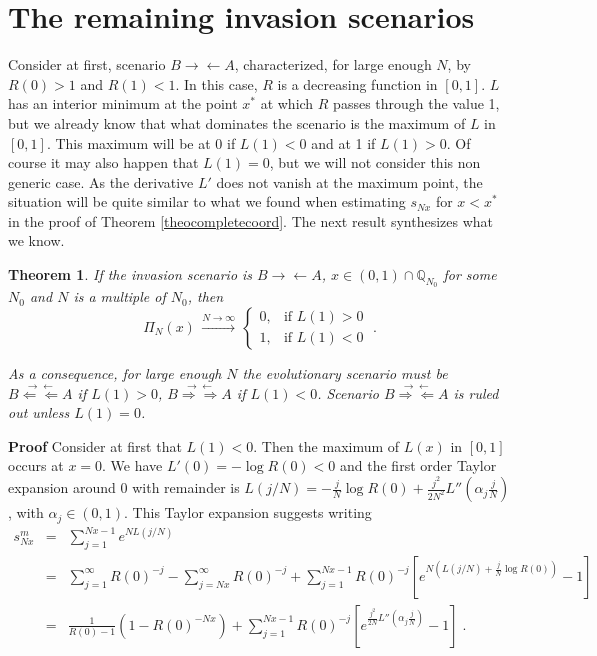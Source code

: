 \documentclass[12pt]{article}
\newtheorem{theorem}{Theorem}
\begin{document}
\section{The remaining invasion scenarios}\label{secremaining}
Consider at first, scenario $B\rightarrow \leftarrow A$,
characterized, for large enough $N$, by  $R(0)>1$ and $R(1)<1$. In this case, $R$ is a decreasing function in $[0,1]$. $L$ has an interior minimum at the point $x^{\ast}$ at which $R$ passes through the value 1, but we already know that what dominates the scenario is the maximum of $L$ in $[0,1]$. This maximum will be at 0 if $L(1)<0$ and at 1 if $L(1)>0$. Of course it may also happen that $L(1)=0$, but we will not consider this non generic case. As the derivative $L'$ does not vanish at the maximum point, the situation will be quite similar to what we found when estimating $s_{Nx}$ for  $x<x^{\ast}$ in the proof of Theorem \ref{theocompletecoord}. The next result synthesizes what we know.
\begin{theorem}  \label{theocoex}
	If the invasion scenario is $B\rightarrow \leftarrow A$, $x \in (0,1) \cap \mathbb{Q}_{N_0}$ for some $N_0$ and $N$ is a multiple of $N_0$, then
	\begin{equation} \label{Picoexist}
	\Pi_N(x) \,\stackrel{N \rightarrow \infty}{\rightarrow}\, \begin{cases} 0, &\mbox{if } L(1)>0 \\ 
	\displaystyle 1, & \mbox{if }  L(1)<0 \end{cases} \;.
	\end{equation}
	
	As a consequence, for large enough $N$ the evolutionary scenario must be $B\stackrel{\rightarrow \leftarrow}{\Leftarrow \Leftarrow} A$ if $L(1)>0$, $B\stackrel{\rightarrow \leftarrow}{\Rightarrow \Rightarrow} A$ if $L(1)<0$. Scenario $B\stackrel{\rightarrow \leftarrow}{\Rightarrow \Leftarrow} A$ is ruled out unless $L(1)=0$.
\end{theorem}
\textbf{Proof}
Consider at first that $L(1)<0$. Then the maximum of $L(x)$ in $[0,1]$ occurs at $x=0$. We have $L'(0)= -\log R(0)<0$ and the first order Taylor expansion around 0 with remainder is $L(j/N)= - \frac{j}{N} \log R(0) + \frac{j^2}{2N^2} L''(\alpha_j \frac{j}{N})$, with $\alpha_j \in(0,1)$. This Taylor expansion suggests writing
\begin{eqnarray}
s^m_{Nx}&=& \sum_{j=1}^{Nx-1}e^{N L(j/N)}\nonumber\\
&=& \sum_{j=1}^{\infty} R(0)^{-j} - \sum_{j=Nx}^{\infty} R(0)^{-j}+ \sum_{j=1}^{Nx-1}R(0)^{-j} \left[e^{N(L(j/N)+\frac{j}{N} \log R(0))}-1\right]\nonumber\\
&=& \frac{1}{R(0)-1} (1-R(0)^{-Nx}) + \sum_{j=1}^{Nx-1}R(0)^{-j} \left[e^{\frac{j^2}{2N} L''(\alpha_j \frac{j}{N})}-1\right]\nonumber\;.
\end{eqnarray}
\end{document}
